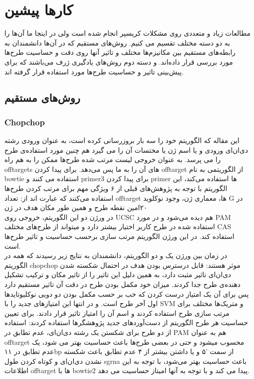 \documentclass[12pt,a4paper,BCOR=.7cm,headsepline,bibliography=totoc]{report}
\begin{document}
\chapter{کارها پیشین}
مطالعات زیاد و متعددی روی مشکلات کریسپر انجام شده است ولی در اینجا ما آن‌ها را به دو دسته مختلف تقسیم می کنیم. روش‌های مستقیم که در آن‌ها دانشمندان به رابطه‌های مستقیم بین مکانیزم‌ها مختلف و تاثیر آنها روی دقت و حساسیت طرح‌ها مورد بررسی قرار داده‌اند. و دسته دوم روش‌های یادگیری ژرف می‌باشند که برای پیش‌بینی تاثیر و حساسیت طرح‌ها مورد استفاده قرار گرفته اند.
\section{روش‌های مستقیم}
\subsection{Chopchop ~\cite{CHOPCHOP3,CHOPCHOP2,CHOPCHOP}}
این مقاله که الگوریتم خود را سه بار بروزرسانی کرده است، به عنوان ورودی رشته دی‌ان‌ای ورودی و یا اسم ژن یا مختسات آن را می گیرد هم چنین مورد استفاده‌ی طرح را می پرسد. به عنوان خروجی لیست مرتب شده طرح‌ها ممکن را به هم راه offtargets های آن را به ما پس می‌دهد. برای پیدا کردن offtarget از الگوریتمی به نام bowtie استفاده می کنند و primer3 برای پیدا کردن primer ها استفاده می‌کند، این الگوریتم با توجه به پژوهش‌های قبلی از ۶ ویژگی مهم برای مرتب کردن طرح‌ها استفاده می‌کنند که عبارت اند از: تعداد offtarget ها، معماری ژن،  وجود نوکلوید G در ۲۰امین نقطه طرح و همین طور مکان هدف در ژن \\
در ورژن دو این الگوریتم، خروجی روی UCSC هم دیده می‌شود و در مورد PAM استفاده شده در طرح کاربر اختیار بیشتر دارد و میتواند از طرح‌های مختلف CAS استفاده کند. در این ورژن الگوریتم مرتب سازی برحسب حساسیت و تاثیر طرح‌ها است.\\
در زمان بین ورژن یک و دو الگوریتم، دانشمندان به نتایج زیر رسیدند که همه در الگوریتم chopchop موثر هستند: قابل درسترس بودن هدف در احتمال شکسته شدن دی‌ان‌ای تاثیر مثبت دارد، به همین دلیل این تاثیر را از تاثیر مکان و ترکیب تشکیل دهنده‌ی طرح جدا کردند.
میزان خود مکمل بودن طرح در دقت آن تاثیر مستقیم دارد پس برای آن یک امتیاز درست کردن که خب بر حسب مکمل بودن دو دویی نوکلیوتاید‌ها اول آخر طرح است. و در انتها این امتیاز‌های جدید را با SVM و متریک‌ها مختلف برای مرتب سازی طرح استفاده کردند و اسم آن را امتیاز تاثیر قرار دادند.
برای تعیین حساسیت هر طرح الگوریتم از دست‌آورد‌های جدید پژوهشگر‌ها استفاده کردند: استفاده از دو طرح برای شکستن یک رشته دی‌ان‌ای، عدم تطابق در PAM هم به عنوان offtarget محسوب میشود و حتی در بعضی طرح‌ها باعث حساسیت بهتر می شود، یک عدم تطابق در ۱۱bp از سمت ‍'۵ و یا داشتن بیشتر از ۴ عدم تطابق باعث شکسته نشدن  دی‌ان‌ای و کوتاه کردن طول sgrna باعث حساسیت بهتر می‌شود، با توجه به این اطلاعات offtarget ها با bowtie2 پیدا می کند و با توجه به آنها امیتاز حساسیت می دهد.
\end{document}
